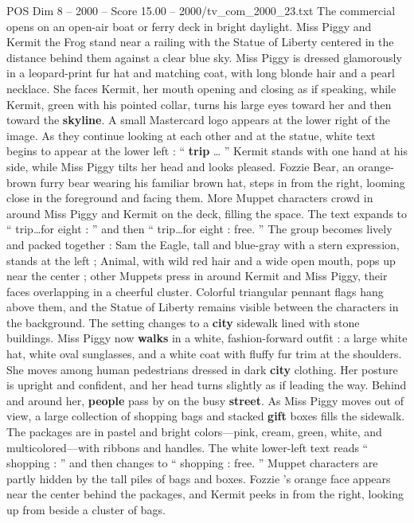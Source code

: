 \begin{textsample}{POS Dim 8 – 2000 – Score 15.00 – 2000/tv\_com\_2000\_23.txt}  \label{ex:f8_pos_001}
The commercial opens on an open-air boat or ferry deck in bright daylight.
Miss Piggy and Kermit the Frog stand near a railing with the Statue of Liberty centered in the distance behind them against a clear blue sky.
Miss Piggy is dressed glamorously in a leopard-print fur hat and matching coat, with long blonde hair and a pearl necklace.
She faces Kermit, her mouth opening and closing as if speaking, while Kermit, green with his pointed collar, turns his large eyes toward her and then toward the \textbf{skyline}.
A small Mastercard logo appears at the lower right of the image.
As they continue looking at each other and at the statue, white text begins to appear at the lower left : “ \textbf{trip} … ” Kermit stands with one hand at his side, while Miss Piggy tilts her head and looks pleased.
Fozzie Bear, an orange-brown furry bear wearing his familiar brown hat, steps in from the right, looming close in the foreground and facing them.
More Muppet characters crowd in around Miss Piggy and Kermit on the deck, filling the space.
The text expands to “ trip…for eight : ” and then “ trip…for eight : free. ” The group becomes lively and packed together : Sam the Eagle, tall and blue-gray with a stern expression, stands at the left ; Animal, with wild red hair and a wide open mouth, pops up near the center ; other Muppets press in around Kermit and Miss Piggy, their faces overlapping in a cheerful cluster.
Colorful triangular pennant flags hang above them, and the Statue of Liberty remains visible between the characters in the background.
The setting changes to a \textbf{city} sidewalk lined with stone buildings.
Miss Piggy now \textbf{walks} in a white, fashion-forward outfit : a large white hat, white oval sunglasses, and a white coat with fluffy fur trim at the shoulders.
She moves among human pedestrians dressed in dark \textbf{city} clothing.
Her posture is upright and confident, and her head turns slightly as if leading the way.
Behind and around her, \textbf{people} pass by on the busy \textbf{street}.
As Miss Piggy moves out of view, a large collection of shopping bags and stacked \textbf{gift} boxes fills the sidewalk.
The packages are in pastel and bright colors—pink, cream, green, white, and multicolored—with ribbons and handles.
The white lower-left text reads “ shopping : ” and then changes to “ shopping : free. ” Muppet characters are partly hidden by the tall piles of bags and boxes.
Fozzie ’s orange face appears near the center behind the packages, and Kermit peeks in from the right, looking up from beside a cluster of bags.

\end{textsample}
